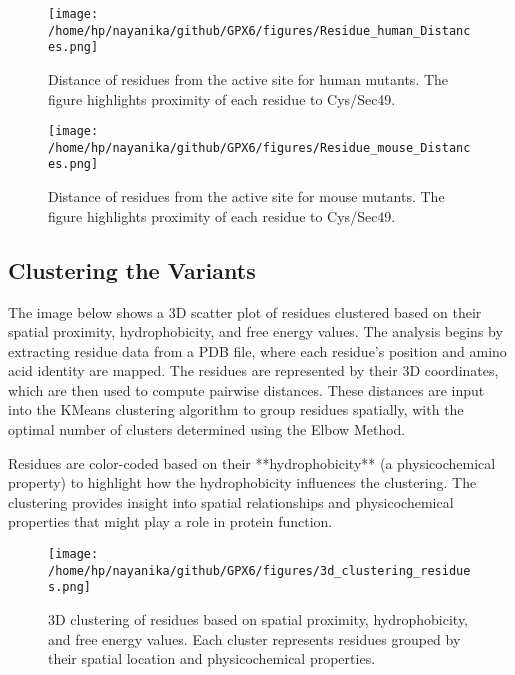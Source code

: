 \documentclass{article}
\begin{document}
\begin{figure}[h!]
    \centering
    \texttt{[image: /home/hp/nayanika/github/GPX6/figures/Residue\_human\_Distances.png]} %
    \caption{Distance of residues from the active site for human mutants. The figure highlights proximity of each residue to Cys/Sec49.}
    \label{fig:human_distances}
\end{figure}

\begin{figure}[h!]
    \centering
    \texttt{[image: /home/hp/nayanika/github/GPX6/figures/Residue\_mouse\_Distances.png]} %
    \caption{Distance of residues from the active site for mouse mutants. The figure highlights proximity of each residue to Cys/Sec49.}
    \label{fig:mouse_distances}
\end{figure}

\subsection{Clustering the Variants}

The image below shows a 3D scatter plot of residues clustered based on their spatial proximity, hydrophobicity, and free energy values. The analysis begins by extracting residue data from a PDB file, where each residue’s position and amino acid identity are mapped. The residues are represented by their 3D coordinates, which are then used to compute pairwise distances. These distances are input into the KMeans clustering algorithm to group residues spatially, with the optimal number of clusters determined using the Elbow Method.

Residues are color-coded based on their **hydrophobicity** (a physicochemical property) to highlight how the hydrophobicity influences the clustering. The clustering provides insight into spatial relationships and physicochemical properties that might play a role in protein function.

\begin{figure}[h!]
    \centering
    \texttt{[image: /home/hp/nayanika/github/GPX6/figures/3d\_clustering\_residues.png]} %
    \caption{3D clustering of residues based on spatial proximity, hydrophobicity, and free energy values. Each cluster represents residues grouped by their spatial location and physicochemical properties.}
    \label{fig:3d_clustering}
\end{figure}
\end{document}
